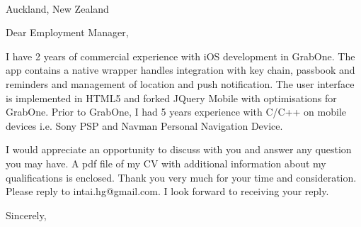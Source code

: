 \topmargin=-1in    %
\textheight=8.5in    %
\oddsidemargin=0pt   %
\textwidth=6.5in     %




\signature{In-Tai Huang}           %
\longindentation=0pt                       %
\let\raggedleft\raggedright                %
 
 
\begin{letter}{
\\
Auckland, New Zealand
}
 
\opening{Dear Employment Manager,} 
 
\noindent I have 2 years of commercial experience with iOS development in GrabOne. The app contains a native wrapper handles integration with key chain, passbook and reminders and management of location and push notification. The user interface is implemented in HTML5 and forked JQuery Mobile with optimisations for GrabOne. Prior to GrabOne, I had 5 years experience with C/C++ on mobile devices i.e. Sony PSP and Navman Personal Navigation Device.

\noindent I would appreciate an opportunity to discuss with you and answer any question you may have. A pdf file of my CV with additional information about my qualifications is enclosed. Thank you very much for your time and consideration. Please reply to intai.hg@gmail.com. I look forward to receiving your reply. 
 
\closing{Sincerely,} 
 

 

\end{letter}
 


